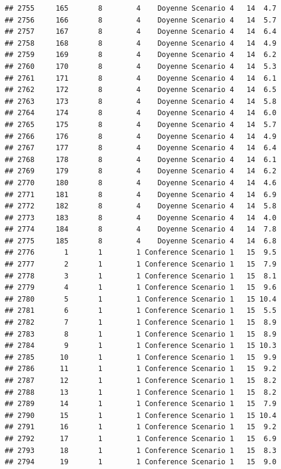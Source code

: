 \documentclass[
]{article}
\begin{document}
\begin{verbatim}
## 2755     165       8        4    Doyenne Scenario 4   14  4.7
## 2756     166       8        4    Doyenne Scenario 4   14  5.7
## 2757     167       8        4    Doyenne Scenario 4   14  6.4
## 2758     168       8        4    Doyenne Scenario 4   14  4.9
## 2759     169       8        4    Doyenne Scenario 4   14  6.2
## 2760     170       8        4    Doyenne Scenario 4   14  5.3
## 2761     171       8        4    Doyenne Scenario 4   14  6.1
## 2762     172       8        4    Doyenne Scenario 4   14  6.5
## 2763     173       8        4    Doyenne Scenario 4   14  5.8
## 2764     174       8        4    Doyenne Scenario 4   14  6.0
## 2765     175       8        4    Doyenne Scenario 4   14  5.7
## 2766     176       8        4    Doyenne Scenario 4   14  4.9
## 2767     177       8        4    Doyenne Scenario 4   14  6.4
## 2768     178       8        4    Doyenne Scenario 4   14  6.1
## 2769     179       8        4    Doyenne Scenario 4   14  6.2
## 2770     180       8        4    Doyenne Scenario 4   14  4.6
## 2771     181       8        4    Doyenne Scenario 4   14  6.9
## 2772     182       8        4    Doyenne Scenario 4   14  5.8
## 2773     183       8        4    Doyenne Scenario 4   14  4.0
## 2774     184       8        4    Doyenne Scenario 4   14  7.8
## 2775     185       8        4    Doyenne Scenario 4   14  6.8
## 2776       1       1        1 Conference Scenario 1   15  9.5
## 2777       2       1        1 Conference Scenario 1   15  7.9
## 2778       3       1        1 Conference Scenario 1   15  8.1
## 2779       4       1        1 Conference Scenario 1   15  9.6
## 2780       5       1        1 Conference Scenario 1   15 10.4
## 2781       6       1        1 Conference Scenario 1   15  5.5
## 2782       7       1        1 Conference Scenario 1   15  8.9
## 2783       8       1        1 Conference Scenario 1   15  8.9
## 2784       9       1        1 Conference Scenario 1   15 10.3
## 2785      10       1        1 Conference Scenario 1   15  9.9
## 2786      11       1        1 Conference Scenario 1   15  9.2
## 2787      12       1        1 Conference Scenario 1   15  8.2
## 2788      13       1        1 Conference Scenario 1   15  8.2
## 2789      14       1        1 Conference Scenario 1   15  7.9
## 2790      15       1        1 Conference Scenario 1   15 10.4
## 2791      16       1        1 Conference Scenario 1   15  9.2
## 2792      17       1        1 Conference Scenario 1   15  6.9
## 2793      18       1        1 Conference Scenario 1   15  8.3
## 2794      19       1        1 Conference Scenario 1   15  9.0

\end{verbatim}
\end{document}

